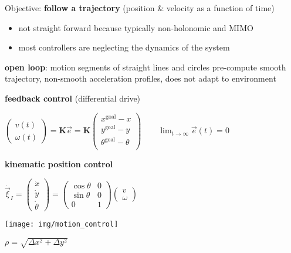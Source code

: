 \documentclass[fontsize=6pt]{scrartcl}
\newcommand{\mat}[1]{\mathbf{#1}}
\begin{document}
\begin{multicols*}{4}
Objective: \textbf{follow a trajectory} (position \& velocity as a function of time)
\begin{itemize}
	\item not straight forward because typically non-holonomic and MIMO
	\item most controllers are neglecting the dynamics of the system
\end{itemize}

\textbf{open loop}: motion segments of straight lines and circles pre-compute smooth trajectory, non-smooth acceleration profiles, does not adapt to environment

\textbf{feedback control} (differential drive)

$
\begin{pmatrix}
v(t)\\
\omega(t)
\end{pmatrix}
=\mat K \vec e
= \mat K
\begin{pmatrix}
x^\text{goal} - x\\
y^\text{goal} - y\\
\theta^\text{goal} - \theta\\
\end{pmatrix}
\qquad \lim_{t\rightarrow\infty} \vec e(t) = 0
$

\textbf{kinematic position control}

\begin{minipage}{0.5\columnwidth}
	$\dot{\vec{\xi}}_I =
	\begin{pmatrix}
	\dot x\\
	\dot y\\
	\dot \theta
	\end{pmatrix}
	=
	\left(
	\begin{smallmatrix}
	\cos\theta & 0\\
	\sin\theta & 0\\
	0 & 1
	\end{smallmatrix}
	\right)
	\begin{pmatrix}
	v\\
	\omega
	\end{pmatrix}
	$

\texttt{[image: img/motion\_control]}
\end{minipage}
\begin{minipage}{0.5\columnwidth}
$\rho = \sqrt{\Delta x^2 + \Delta y^2}$


\end{minipage}
\end{multicols*}
\end{document}
